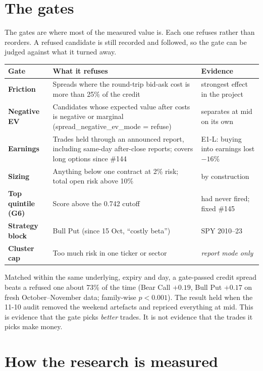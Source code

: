 \documentclass[11pt,a4paper]{article}
\newcommand{\code}[1]{{\ttfamily\small #1}}
\begin{document}
\section{The gates}

The gates are where most of the measured value is. Each one refuses rather than
reorders. A refused candidate is still recorded and followed, so the gate can be
judged against what it turned away.

\begin{tabularx}{\textwidth}{@{}>{\bfseries}l X l@{}}
\toprule
Gate & What it refuses & Evidence \\
\midrule
Friction & Spreads where the round-trip bid-ask cost is more than 25\% of the credit & strongest effect in the project \\
Negative EV & Candidates whose expected value after costs is negative or marginal (\code{spread\_negative\_ev\_mode = refuse}) & separates at mid on its own \\
Earnings & Trades held through an announced report, including same-day after-close reports; covers long options since \#144 & E1-L: buying into earnings lost $-16\%$ \\
Sizing & Anything below one contract at 2\% risk; total open risk above 10\% & by construction \\
Top quintile (G6) & Score above the 0.742 cutoff & had never fired; fixed \#145 \\
Strategy block & Bull Put (since 15 Oct, ``costly beta'') & SPY 2010--23 \\
Cluster cap & Too much risk in one ticker or sector & \emph{report mode only} \\
\bottomrule
\end{tabularx}

\begin{goodbox}[title={The gate works, on a relative basis}]
Matched within the same underlying, expiry and day, a gate-passed credit spread beats a
refused one about 73\% of the time (Bear Call $+0.19$, Bull Put $+0.17$ on fresh
October--November data; family-wise $p<0.001$). The result held when the 11-10 audit removed
the weekend artefacts and repriced everything at mid. This is evidence that the gate picks
\emph{better} trades. It is not evidence that the trades it picks make money.
\end{goodbox}

\section{How the research is measured}
\end{document}
